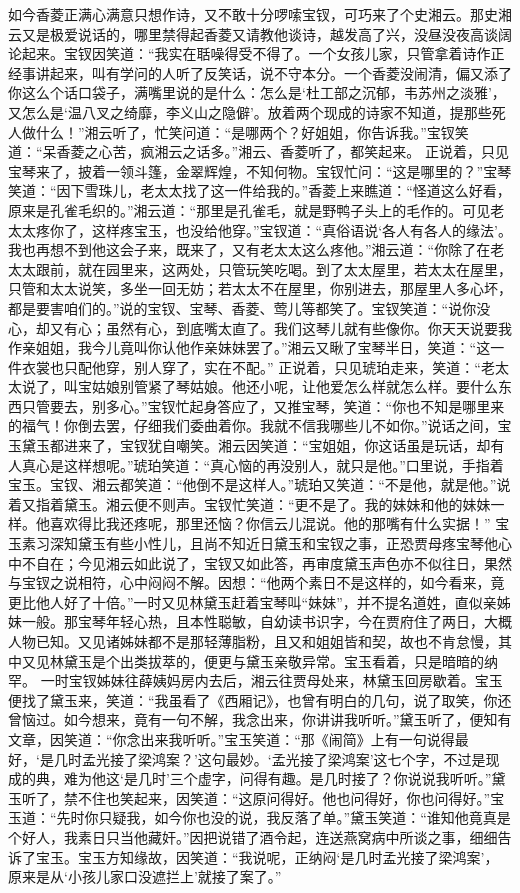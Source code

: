 \documentclass[12pt,oneside]{book}
\begin{document}
如今香菱正满心满意只想作诗，又不敢十分啰嗦宝钗，可巧来了个史湘云。那史湘云又是极爱说话的，哪里禁得起香菱又请教他谈诗，越发高了兴，没昼没夜高谈阔论起来。宝钗因笑道：“我实在聒噪得受不得了。一个女孩儿家，只管拿着诗作正经事讲起来，叫有学问的人听了反笑话，说不守本分。一个香菱没闹清，偏又添了你这么个话口袋子，满嘴里说的是什么：怎么是‘杜工部之沉郁，韦苏州之淡雅’，又怎么是‘温八叉之绮靡，李义山之隐僻’。放着两个现成的诗家不知道，提那些死人做什么！”湘云听了，忙笑问道：“是哪两个？好姐姐，你告诉我。”宝钗笑道：“呆香菱之心苦，疯湘云之话多。”湘云、香菱听了，都笑起来。
正说着，只见宝琴来了，披着一领斗篷，金翠辉煌，不知何物。宝钗忙问：“这是哪里的？”宝琴笑道：“因下雪珠儿，老太太找了这一件给我的。”香菱上来瞧道：“怪道这么好看，原来是孔雀毛织的。”湘云道：“那里是孔雀毛，就是野鸭子头上的毛作的。可见老太太疼你了，这样疼宝玉，也没给他穿。”宝钗道：“真俗语说‘各人有各人的缘法’。我也再想不到他这会子来，既来了，又有老太太这么疼他。”湘云道：“你除了在老太太跟前，就在园里来，这两处，只管玩笑吃喝。到了太太屋里，若太太在屋里，只管和太太说笑，多坐一回无妨；若太太不在屋里，你别进去，那屋里人多心坏，都是要害咱们的。”说的宝钗、宝琴、香菱、莺儿等都笑了。宝钗笑道：“说你没心，却又有心；虽然有心，到底嘴太直了。我们这琴儿就有些像你。你天天说要我作亲姐姐，我今儿竟叫你认他作亲妹妹罢了。”湘云又瞅了宝琴半日，笑道：“这一件衣裳也只配他穿，别人穿了，实在不配。”
正说着，只见琥珀走来，笑道：“老太太说了，叫宝姑娘别管紧了琴姑娘。他还小呢，让他爱怎么样就怎么样。要什么东西只管要去，别多心。”宝钗忙起身答应了，又推宝琴，笑道：“你也不知是哪里来的福气！你倒去罢，仔细我们委曲着你。我就不信我哪些儿不如你。”说话之间，宝玉黛玉都进来了，宝钗犹自嘲笑。湘云因笑道：“宝姐姐，你这话虽是玩话，却有人真心是这样想呢。”琥珀笑道：“真心恼的再没别人，就只是他。”口里说，手指着宝玉。宝钗、湘云都笑道：“他倒不是这样人。”琥珀又笑道：“不是他，就是他。”说着又指着黛玉。湘云便不则声。宝钗忙笑道：“更不是了。我的妹妹和他的妹妹一样。他喜欢得比我还疼呢，那里还恼？你信云儿混说。他的那嘴有什么实据！”
宝玉素习深知黛玉有些小性儿，且尚不知近日黛玉和宝钗之事，正恐贾母疼宝琴他心中不自在；今见湘云如此说了，宝钗又如此答，再审度黛玉声色亦不似往日，果然与宝钗之说相符，心中闷闷不解。因想：“他两个素日不是这样的，如今看来，竟更比他人好了十倍。”一时又见林黛玉赶着宝琴叫“妹妹”，并不提名道姓，直似亲姊妹一般。那宝琴年轻心热，且本性聪敏，自幼读书识字，今在贾府住了两日，大概人物已知。又见诸姊妹都不是那轻薄脂粉，且又和姐姐皆和契，故也不肯怠慢，其中又见林黛玉是个出类拔萃的，便更与黛玉亲敬异常。宝玉看着，只是暗暗的纳罕。
一时宝钗姊妹往薛姨妈房内去后，湘云往贾母处来，林黛玉回房歇着。宝玉便找了黛玉来，笑道：“我虽看了《西厢记》，也曾有明白的几句，说了取笑，你还曾恼过。如今想来，竟有一句不解，我念出来，你讲讲我听听。”黛玉听了，便知有文章，因笑道：“你念出来我听听。”宝玉笑道：“那《闹简》上有一句说得最好，‘是几时孟光接了梁鸿案？’这句最妙。‘孟光接了梁鸿案’这七个字，不过是现成的典，难为他这‘是几时’三个虚字，问得有趣。是几时接了？你说说我听听。”黛玉听了，禁不住也笑起来，因笑道：“这原问得好。他也问得好，你也问得好。”宝玉道：“先时你只疑我，如今你也没的说，我反落了单。”黛玉笑道：“谁知他竟真是个好人，我素日只当他藏奸。”因把说错了酒令起，连送燕窝病中所谈之事，细细告诉了宝玉。宝玉方知缘故，因笑道：“我说呢，正纳闷‘是几时孟光接了梁鸿案’，原来是从‘小孩儿家口没遮拦上’就接了案了。”
\end{document}
